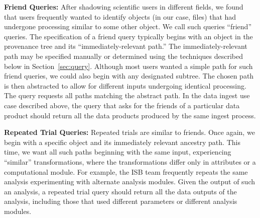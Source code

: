 \documentclass[10pt]{article}
\begin{document}
\textbf{Friend Queries: }
After shadowing scientific users in different fields, we found that
users frequently wanted to identify objects (in our case, files) that
had undergone processing similar to some other object.
We call such queries ``friend'' queries.
The specification of a friend query typically begins with an object in
the provenance tree and its ``immediately-relevant path.'' 
The immediately-relevant path may be specified manually or determined using
the techniques described below in Section~\ref{sec:query}.
Although most users wanted a simple path for such friend queries, we
could also begin with any designated subtree.
The chosen path is then abstracted to allow for different inputs undergoing
identical processing.
The query requests all paths matching the abstract path.
In the data ingest use case described above, the query that asks for the
friends of a particular data product should return all the data products
produced by the same ingest process.
% 

\textbf{Repeated Trial Queries: }
Repeated trials are similar to friends.  Once again, we begin with a specific
object and its immediately relevant ancestry path.
This time, we want all such paths beginning with the same input, experiencing
``similar'' transformations, where the transformations differ only in
attributes or a computational module.
For example, the ISB team frequently repeats the same analysis experimenting
with alternate analysis modules.
Given the output of such an analysis, a repeated trial query should return
all the data outputs of the analysis, including those that used different
parameters or different analysis modules.

% 
\end{document}
